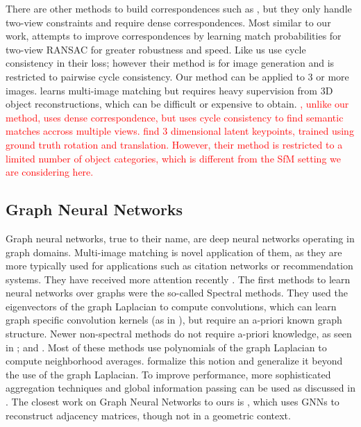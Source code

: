 \documentclass{article} %
\begin{document}
There are other methods to build correspondences such as \cite{choy2016universal}, but they only handle two-view constraints and require dense correspondences.
Most similar to our work, \cite{yi2018learning} attempts to improve correspondences by learning match probabilities for two-view RANSAC for greater robustness and speed.
Like us \cite{zhu2017unpaired} use cycle consistency in their loss; however their method is for image generation and is restricted to pairwise cycle consistency.
Our method can be applied to 3 or more images. 
\cite{hartmann2017learned} learns multi-image matching but requires heavy supervision from 3D object reconstructions, which can be difficult or expensive to obtain.
\textcolor{red}{\cite{zhou2015flowweb}, unlike our method, uses dense correspondence, but uses cycle consistency to find semantic matches accross multiple views.}
\textcolor{red}{\cite{suwajanakorn2018discovery} find 3 dimensional latent keypoints, trained using ground truth rotation and translation. However, their method is restricted to a limited number of object categories, which is different from the SfM setting we are considering here.}

\subsection{Graph Neural Networks}
Graph neural networks, true to their name, are deep neural networks operating in graph domains.
Multi-image matching is novel application of them, as they are more typically used for applications such as citation networks or recommendation systems.
They have received more attention recently \citep{bronstein2017geometric, defferrard2016convolutional, kipf2017semi, scarselli2009graph, gama2018mimo, gama2018convolutional, battaglia2018relational}.
The first methods to learn neural networks over graphs were the so-called Spectral methods.
They used the eigenvectors of the graph Laplacian to compute convolutions, which can learn graph specific convolution kernels (as in \cite{bruna2013spectral}), but require an a-priori known graph structure. 
Newer non-spectral methods do not require a-priori knowledge, as seen in \cite{bronstein2017geometric, kipf2017semi, scarselli2009graph}; and \cite{gama2018convolutional}.
Most of these methods use polynomials of the graph Laplacian to compute neighborhood averages.
\cite{gama2018mimo, gama2018convolutional} formalize this notion and generalize it beyond the use of the graph Laplacian.
To improve performance, more sophisticated aggregation techniques and global information passing can be used as discussed in \cite{battaglia2018relational}.
The closest work on Graph Neural Networks to ours is \cite{kipf2016variational}, which uses GNNs to reconstruct adjacency matrices, though not in a geometric context.
\end{document}
